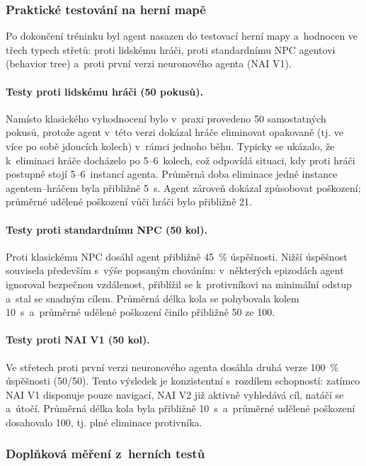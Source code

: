\subsubsection{Praktické testování na herní mapě}

Po dokončení tréninku byl agent nasazen do testovací herní mapy a~hodnocen ve třech typech střetů: proti lidskému hráči, proti standardnímu NPC agentovi (behavior tree) a~proti první verzi neuronového agenta (NAI V1).

\paragraph{Testy proti lidskému hráči (50 pokusů).}
Namísto klasického vyhodnocení  bylo v~praxi provedeno 50 samostatných pokusů, protože agent v~této verzi dokázal hráče eliminovat opakovaně (tj. ve více po sobě jdoucích kolech) v~rámci jednoho běhu. Typicky se ukázalo, že k~eliminaci hráče docházelo po 5--6~kolech, což odpovídá situaci, kdy proti hráči postupně stojí 5--6~instancí agenta. Průměrná doba eliminace jedné instance agentem--hráčem byla přibližně 5~s. Agent zároveň dokázal způsobovat poškození; průměrné udělené poškození vůči hráči bylo přibližně 21.

\paragraph{Testy proti standardnímu NPC (50 kol).}
Proti klasickému NPC dosáhl agent přibližně 45~\% úspěšnosti. Nižší úspěšnost souvisela především s~výše popsaným chováním: v~některých epizodách agent ignoroval bezpečnou vzdálenost, přiblížil se k~protivníkovi na minimální odstup a~stal se snadným cílem. Průměrná délka kola se pohybovala kolem 10~s~a~průměrné udělené poškození činilo přibližně 50 ze 100.

\paragraph{Testy proti NAI V1 (50 kol).}
Ve střetech proti první verzi neuronového agenta dosáhla druhá verze 100~\% úspěšnosti (50/50). Tento výsledek je konzistentní s~rozdílem schopností: zatímco NAI V1 disponuje pouze navigací, NAI V2 již aktivně vyhledává cíl, natáčí se a~útočí. Průměrná délka kola byla přibližně 10~s~a~průměrné udělené poškození dosahovalo 100, tj. plné eliminace protivníka.

\newpage

\subsubsection{Doplňková měření z~herních testů}

